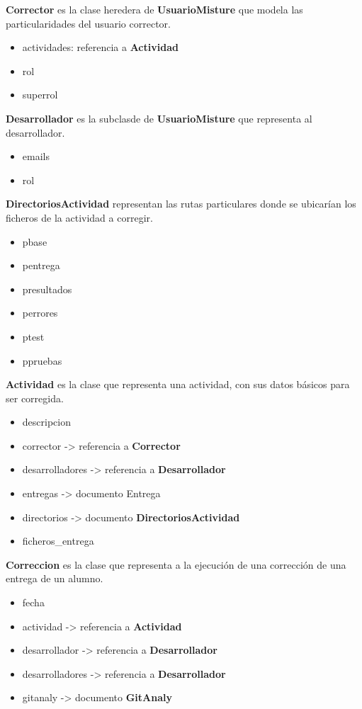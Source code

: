 \textbf{Corrector} es la clase heredera de \textbf{UsuarioMisture} que modela las particularidades del usuario corrector.
\begin{itemize}
\item actividades: referencia a \textbf{Actividad}
\item rol
\item superrol
\end{itemize}


\textbf{Desarrollador} es la subclasde de \textbf{UsuarioMisture} que representa al desarrollador.
\begin{itemize}
\item emails
\item rol
\end{itemize}


\textbf{DirectoriosActividad} representan las rutas particulares donde se ubicarían los ficheros de la actividad a corregir.
\begin{itemize}
\item pbase
\item pentrega
\item presultados
\item perrores
\item ptest
\item ppruebas
\end{itemize}


\textbf{Actividad} es la clase que representa una actividad, con sus datos básicos para ser corregida.
\begin{itemize}
\item descripcion
\item corrector -> referencia a \textbf{Corrector}
\item desarrolladores -> referencia a \textbf{Desarrollador}
\item entregas -> documento Entrega
\item directorios -> documento \textbf{DirectoriosActividad}
\item ficheros\_entrega
\end{itemize}


\textbf{Correccion} es la clase que representa a la ejecución de una corrección de una entrega de un alumno.
\begin{itemize}
\item fecha
\item actividad -> referencia a \textbf{Actividad}
\item desarrollador -> referencia a \textbf{Desarrollador}
\item desarrolladores -> referencia a \textbf{Desarrollador}
\item gitanaly -> documento \textbf{GitAnaly}
\end{itemize}


